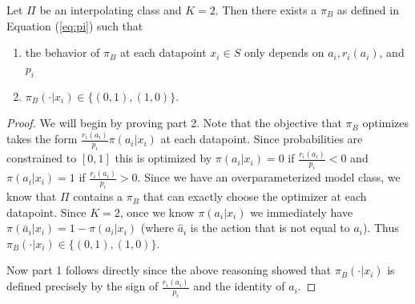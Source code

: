 \begin{lemma}\label{lem:policy_decomp}
Let $ \Pi$ be an interpolating class and $ K = 2$. Then there exists a $ \pi_B $ as defined in Equation (\ref{eq:pi}) such that
\begin{enumerate}
    \item the behavior of $ \pi_B$ at each datapoint $ x_i \in S$ only depends on $ a_i, r_i(a_i)$, and $ p_i$
    \item $ \pi_B(\cdot|x_i) \in \{(0,1),(1,0)\}$.
\end{enumerate}
\end{lemma}
\begin{proof}
We will begin by proving part 2. Note that the objective that $ \pi_B$ optimizes takes the form $ \frac{r_i(a_i)}{p_i}\pi(a_i|x_i)$ at each datapoint. Since probabilities are constrained to $[0,1]$ this is optimized by $ \pi(a_i|x_i) = 0$ if $ \frac{r_i(a_i)}{p_i} < 0$ and $ \pi(a_i|x_i) = 1$ if $ \frac{r_i(a_i)}{p_i} > 0$. Since we have an overparameterized model class, we know that $ \Pi$ contains a $ \pi_B$ that can exactly choose the optimizer at each datapoint. Since $ K=2$, once we know $ \pi(a_i|x_i)$ we immediately have $ \pi(\bar a_i|x_i) = 1 - \pi(a_i|x_i)$ (where $ \hat a_i$ is the action that is not equal to $ a_i$). Thus $ \pi_B(\cdot|x_i) \in \{(0,1),(1,0)\}$.

Now part 1 follows directly since the above reasoning showed that $ \pi_B(\cdot|x_i)$ is defined precisely by the sign of $ \frac{r_i(a_i)}{p_i}$ and the identity of $ a_i$.
\end{proof}



\vsthm*

